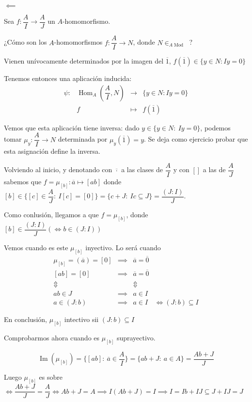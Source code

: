 \documentclass[openany]{book}
\begin{document}
\begin{exercise}
    $ $

    \noindent $ \impliedby$

    Sea $ f:\dfrac{A}{I} \to \dfrac{A}{J}$ un $ A$-homomorfismo. 

    ¿Cómo son los $ A$-homomorfismos $ f: \dfrac{A}{I}\to N$, donde $ N \in  _{A\operatorname{Mod}}$ ?

    Vienen unívocamente determinados por la imagen del $ \overline{1}$, $ f(\overline{1}) \in \{y \in N: Iy = 0\}$

    Tenemos entonces una aplicación inducida:
    $$ 
    \begin{aligned}
        \psi: & \operatorname{Hom}_{A}\left(\dfrac{A}{I},N\right) & \to & \{y \in N: Iy = 0\}\\ 
        & f & \mapsto & f(\overline{1})
    \end{aligned}
    $$

    Vemos que esta aplicación tiene inversa: dado $ y \in \{y \in N:\ Iy = 0\}$, podemos tomar $ \mu_{y}: \dfrac{A}{I}\to N$ determinada por $ \mu_{y}(\overline{1}) = y$. Se deja como ejercicio probar que esta asignación define la inversa.

    Volviendo al inicio, y denotando con $ \overline{\cdot }$ a las clases de $ \dfrac{A}{I}$ y con $ []$ a las de $ \dfrac{A}{J}$ sabemos que $ f = \mu_{[b]}: \overline{a} \mapsto [ab]$ donde $ [b] \in \{[c] \in \dfrac{A}{J} :\ I [c] = [0]\} = \{c+J:\ Ic \subseteq J\} = \dfrac{(J:I)}{J}$.
    
    Como conlusión, llegamos a que $ f = \mu_{[b]}$, donde $ [b] \in \dfrac{(J:I)}{J} (\iff b \in (J:I))$

    Vemos cuando es este $ \mu_{[b]}$ inyectivo. Lo será cuando
    $$ 
    \begin{aligned}
        \mu_{[b]} = (\overline{a}) = [0] &  \implies  & \overline{a} = \overline{0}\\ 
        [ab] = [0] & \implies & \overline{a} = \overline{0}\\ 
        \Updownarrow & & \Updownarrow\\ 
        ab \in J & \implies & a \in I \\ 
        a \in (J:b) & \implies & a \in I & \iff (J:b) \subseteq I
    \end{aligned}
    $$

    En conclusión, $ \mu_{[b]}$ intectivo sii $ (J:b)\subseteq I$

    Comprobarmos ahora cuando es $ \mu_{[b]}$ suprayectivo.

    $$ \operatorname{Im}(\mu_{[b]}) = \{[ab]:\ \overline{a} \in \dfrac{A}{I}\} = \{ab+J:\ a \in A\} = \dfrac{Ab+J}{J} $$

    Luego $ \mu_{[b]}$ es sobre $ \iff \dfrac{Ab+J}{J} = \dfrac{A}{J} \iff Ab+J = A \implies I (Ab+J) = I \implies I = Ib+ IJ \subseteq J+IJ = J$

\end{exercise}
\end{document}
